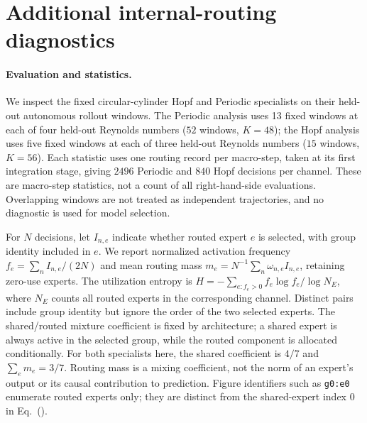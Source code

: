 \section{Additional internal-routing diagnostics}
\label{app:internal_routing}

\paragraph{Evaluation and statistics.}
We inspect the fixed circular-cylinder Hopf and Periodic specialists on their
held-out autonomous rollout windows. The Periodic analysis uses 13 fixed windows
at each of four held-out Reynolds numbers ($52$ windows, $K=48$); the Hopf
analysis uses five fixed windows at each of three held-out Reynolds numbers
($15$ windows, $K=56$). Each statistic uses one routing record per macro-step,
taken at its first integration stage, giving $2496$ Periodic and $840$ Hopf
decisions per channel. These are macro-step statistics, not a count of all
right-hand-side evaluations. Overlapping windows are not treated as independent
trajectories, and no diagnostic is used for model selection.

For $N$ decisions, let $I_{n,e}$ indicate whether routed expert $e$ is selected,
with group identity included in $e$. We report normalized activation frequency
$f_e=\sum_n I_{n,e}/(2N)$ and mean routing mass
$m_e=N^{-1}\sum_n\omega_{n,e}I_{n,e}$, retaining zero-use experts.
The utilization entropy is
$H=-\sum_{e:f_e>0}f_e\log f_e/\log N_E$, where $N_E$ counts all routed
experts in the corresponding channel. Distinct pairs include group identity
but ignore the order of the two selected experts. The shared/routed mixture
coefficient is fixed by architecture; a shared expert is always active in the
selected group, while the routed component is allocated conditionally.
For both specialists here, the shared coefficient is $4/7$ and
$\sum_e m_e=3/7$.
Routing mass is a mixing coefficient, not the norm of an expert's output or
its causal contribution to prediction.
Figure identifiers such as \texttt{g0:e0} enumerate routed experts only;
they are distinct from the shared-expert index $0$ in
Eq.~().

